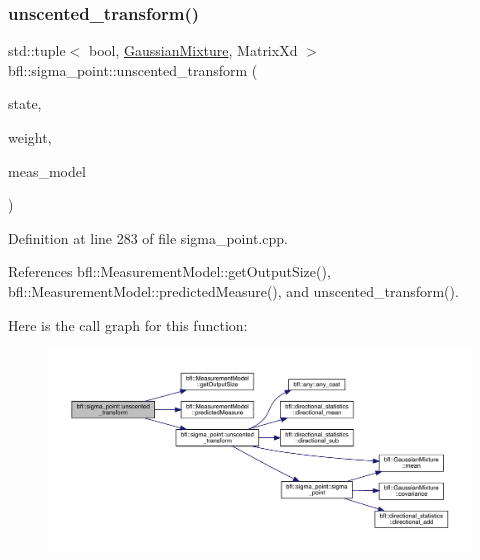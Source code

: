 \subsubsection{\texorpdfstring{unscented\+\_\+transform()}{unscented\_transform()}\hspace{0.1cm}{\footnotesize\ttfamily [7/8]}}
{\footnotesize\ttfamily std\+::tuple$<$ bool, \mbox{\hyperlink{classbfl_1_1GaussianMixture}{Gaussian\+Mixture}}, Matrix\+Xd $>$ bfl\+::sigma\+\_\+point\+::unscented\+\_\+transform (\begin{DoxyParamCaption}\item[{const \mbox{\hyperlink{classbfl_1_1GaussianMixture}{Gaussian\+Mixture}} \&}]{state,  }\item[{const \mbox{\hyperlink{structbfl_1_1sigma__point_1_1UTWeight}{U\+T\+Weight}} \&}]{weight,  }\item[{\mbox{\hyperlink{classbfl_1_1MeasurementModel}{Measurement\+Model}} \&}]{meas\+\_\+model }\end{DoxyParamCaption})}



Definition at line 283 of file sigma\+\_\+point.\+cpp.



References bfl\+::\+Measurement\+Model\+::get\+Output\+Size(), bfl\+::\+Measurement\+Model\+::predicted\+Measure(), and unscented\+\_\+transform().

Here is the call graph for this function\+:
\nopagebreak
\begin{figure}[H]
\begin{center}
\leavevmode
\includegraphics[width=350pt]{namespacebfl_1_1sigma__point_a5b51d83e121121ecc6d65e9e5e7d6859_cgraph}
\end{center}
\end{figure}
\mbox{\label{namespacebfl_1_1sigma__point_a27f6087b127407402338b68bf7853ae6}} 
